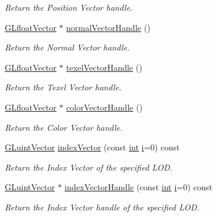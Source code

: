 \begin{DoxyCompactItemize}
\begin{DoxyCompactList}\small\item\em Return the Position Vector handle. \end{DoxyCompactList}\item 
\hyperlink{glc__global_8h_a9f3f0b00cd127b066c9931b9c257a046}{G\-Lfloat\-Vector} $\ast$ \hyperlink{class_g_l_c___mesh_data_a15ddb140e57b6a2a0b4cb192aa560dc5}{normal\-Vector\-Handle} ()
\begin{DoxyCompactList}\small\item\em Return the Normal Vector handle. \end{DoxyCompactList}\item 
\hyperlink{glc__global_8h_a9f3f0b00cd127b066c9931b9c257a046}{G\-Lfloat\-Vector} $\ast$ \hyperlink{class_g_l_c___mesh_data_a2b74d1592ec40a6db41d034ec8a995f2}{texel\-Vector\-Handle} ()
\begin{DoxyCompactList}\small\item\em Return the Texel Vector handle. \end{DoxyCompactList}\item 
\hyperlink{glc__global_8h_a9f3f0b00cd127b066c9931b9c257a046}{G\-Lfloat\-Vector} $\ast$ \hyperlink{class_g_l_c___mesh_data_a5011bbc889e521a58f62e80f69671c3a}{color\-Vector\-Handle} ()
\begin{DoxyCompactList}\small\item\em Return the Color Vector handle. \end{DoxyCompactList}\item 
\hyperlink{glc__global_8h_a0552183ff79261cd4beedf2c19b9e70b}{G\-Luint\-Vector} \hyperlink{class_g_l_c___mesh_data_a9f049bd666b8bb1640c5e6ab38a31fb8}{index\-Vector} (const \hyperlink{ioapi_8h_a787fa3cf048117ba7123753c1e74fcd6}{int} \hyperlink{uavobjecttemplate_8m_a6f6ccfcf58b31cb6412107d9d5281426}{i}=0) const 
\begin{DoxyCompactList}\small\item\em Return the Index Vector of the specified L\-O\-D. \end{DoxyCompactList}\item 
\hyperlink{glc__global_8h_a0552183ff79261cd4beedf2c19b9e70b}{G\-Luint\-Vector} $\ast$ \hyperlink{class_g_l_c___mesh_data_a7c5e24f46859b8d019a20dc25c56a568}{index\-Vector\-Handle} (const \hyperlink{ioapi_8h_a787fa3cf048117ba7123753c1e74fcd6}{int} \hyperlink{uavobjecttemplate_8m_a6f6ccfcf58b31cb6412107d9d5281426}{i}=0) const 
\begin{DoxyCompactList}\small\item\em Return the Index Vector handle of the specified L\-O\-D. \end{DoxyCompactList}\item 

\end{DoxyCompactItemize}
